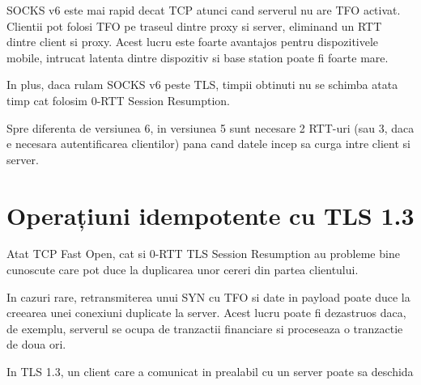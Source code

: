 SOCKS v6 este mai rapid decat TCP atunci cand serverul nu are TFO activat.
Clientii pot folosi TFO pe traseul dintre proxy si server, eliminand un RTT dintre client si proxy.
Acest lucru este foarte avantajos pentru dispozitivele mobile, intrucat latenta dintre dispozitiv si base station
poate fi foarte mare.

In plus, daca rulam SOCKS v6 peste TLS, timpii obtinuti nu se schimba atata timp cat folosim 0-RTT Session Resumption.

Spre diferenta de versiunea 6, in versiunea 5 sunt necesare 2 RTT-uri (sau 3, daca e necesara autentificarea clientilor)
pana cand datele incep sa curga intre client si server.

\section{Operațiuni idempotente cu TLS 1.3}

Atat TCP Fast Open, cat si 0-RTT TLS Session Resumption au probleme bine cunoscute care pot duce la duplicarea unor
cereri din partea clientului.

In cazuri rare, retransmiterea unui SYN cu TFO si date in payload poate duce la creearea unei conexiuni duplicate la server.
Acest lucru poate fi dezastruos daca, de exemplu, serverul se ocupa de tranzactii financiare si proceseaza o tranzactie de doua ori.

In TLS 1.3, un client care a comunicat in prealabil cu un server poate sa deschida 

